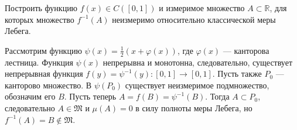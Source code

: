 \begin{task}{10}
Построить функцию $f(x) \in C([0, 1])$ и измеримое множество $A \subset \mathbb{R}$, для которых множество $f^{-1}(A)$ неизмеримо относительно классической меры Лебега.
\end{task}

\begin{solution}
Рассмотрим функцию $\psi(x) = \frac{1}{2}(x + \varphi(x))$, где $\varphi(x)$ --- канторова лестница. Функция $\psi(x)$ непрерывна и монотонна, следовательно, существует непрерывная функция $f(y) = \psi^{-1}(y): [0, 1] \rightarrow [0, 1]$. Пусть также $P_0$ --- канторово множество. В $\psi(P_0)$ существует неизмеримое подмножество, обозначим его $B$. Пусть теперь $A = f(B) = \psi^{-1}(B)$. Тогда $A \subset P_0$, следовательно $A \in \mathfrak{M}$ и $\mu(A) = 0$ в силу полноты меры Лебега, но $f^{-1}(A) = B \notin \mathfrak{M}$.
\end{solution}